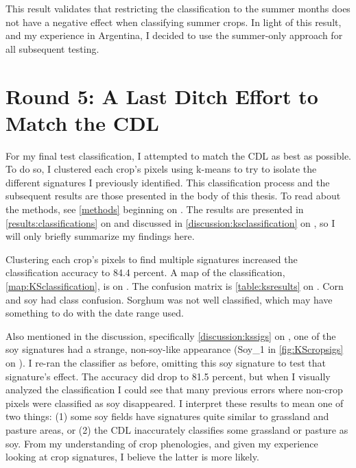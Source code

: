 This result validates that restricting the classification to the summer months does not have a negative effect when classifying summer crops. In light of this result, and my experience in Argentina, I decided to use the summer-only approach for all subsequent testing.


\section{Round 5: A Last Ditch Effort to Match the CDL}

For my final test classification, I attempted to match the CDL as best as possible. To do so, I clustered each crop's pixels using k-means to try to isolate the different signatures I previously identified. This classification process and the subsequent results are those presented in the body of this thesis. To read about the methods, see \cref{methods} beginning on . The results are presented in \autoref{results:classifications} on  and discussed in \autoref{discussion:ksclassification} on , so I will only briefly summarize my findings here. 

Clustering each crop's pixels to find multiple signatures increased the classification accuracy to 84.4 percent. A map of the classification, \cref{map:KSclassification}, is on . The confusion matrix is \cref{table:ksresults} on . Corn and soy had class confusion. Sorghum was not well classified, which may have something to do with the date range used.


Also mentioned in the discussion, specifically \autoref{discussion:kssigs} on , one of the soy signatures had a strange, non-soy-like appearance (Soy\_1 in \cref{fig:KScropsigs} on ). I re-ran the classifier as before, omitting this soy signature to test that signature's effect. The accuracy did drop to 81.5 percent, but when I visually analyzed the classification I could see that many previous errors where non-crop pixels were classified as soy disappeared. I interpret these results to mean one of two things: (1) some soy fields have signatures quite similar to grassland and pasture areas, or (2) the CDL inaccurately classifies some grassland or pasture as soy. From my understanding of crop phenologies, and given my experience looking at crop signatures, I believe the latter is more likely.

